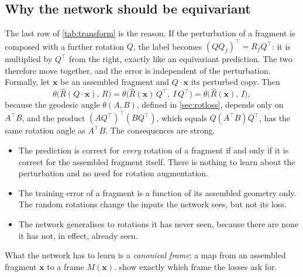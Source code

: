 \documentclass[11pt,a4paper]{article}
\theoremstyle{remark}
\newcommand{\x}{\mathbf{x}}
\newcommand{\T}{^{\top}}
\begin{document}
\subsection{Why the network should be equivariant}
\label{sec:whyequi}
The last row of \cref{tab:transform} is the reason. If the perturbation of a fragment is composed with a further rotation $Q$, the label becomes $(QQ_f)\T=R_fQ\T$: it is multiplied by $Q\T$ from the right, exactly like an equivariant prediction. The two therefore move together, and the error is independent of the perturbation. Formally, let $\x$ be an assembled fragment and $Q\cdot\x$ its perturbed copy. Then
\begin{equation}
  \theta\big(\hat R(Q\cdot\x),\,R\big)
  =\theta\big(\hat R(\x)\,Q\T,\ I\,Q\T\big)
  =\theta\big(\hat R(\x),\,I\big),
  \label{eq:cancel}
\end{equation}
because the geodesic angle $\theta(A,B)$, defined in \cref{sec:rotloss}, depends only on $A\T B$, and the product $(AQ\T)\T(BQ\T)$, which equals $Q(A\T B)Q\T$, has the same rotation angle as $A\T B$. The consequences are strong.
\begin{itemize}
  \item The prediction is correct for \emph{every} rotation of a fragment if and only if it is correct for the assembled fragment itself. There is nothing to learn about the perturbation and no need for rotation augmentation.
  \item The training error of a fragment is a function of its assembled geometry only. The random rotations change the inputs the network sees, but not its loss.
  \item The network generalises to rotations it has never seen, because there are none it has not, in effect, already seen.
\end{itemize}
What the network has to learn is a \emph{canonical frame}: a map from an assembled fragment $\x$ to a frame $M(\x)$.  show exactly which frame the losses ask for.
\end{document}
